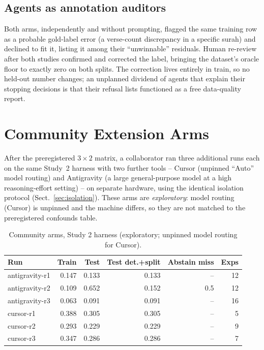\documentclass[runningheads]{llncs}
\begin{document}
\subsection{Agents as annotation auditors}
\label{sec:study2-audit}
Both arms, independently and without prompting, flagged the same training
row as a probable gold-label error (a verse-count discrepancy in a specific
surah) and declined to fit it, listing it among their ``unwinnable''
residuals. Human re-review after both studies confirmed and corrected the
label, bringing the dataset's oracle floor to exactly zero on both splits.
The correction lives entirely in train, so no held-out number changes; an
unplanned dividend of agents that explain their stopping decisions is that
their refusal lists functioned as a free data-quality report.

\section{Community Extension Arms}
\label{sec:community}

After the preregistered $3\times2$ matrix, a collaborator ran three
additional runs each on the same Study~2 harness with two further tools --
Cursor (unpinned ``Auto'' model routing) and Antigravity (a large
general-purpose model at a high reasoning-effort setting) -- on separate
hardware, using the identical isolation protocol
(Sect.~\ref{sec:isolation}). These arms are \emph{exploratory}: model
routing (Cursor) is unpinned and the machine differs, so they are not
matched to the preregistered confounds table.

\begin{table}[t]
\centering
\caption{Community arms, Study 2 harness (exploratory; unpinned model
routing for Cursor).}
\label{tab:community}
\begin{tabular}{lrrrrr}
\toprule
Run & Train & Test & Test det.+split & Abstain miss & Exps \\
\midrule
antigravity-r1 & 0.147 & 0.133 & 0.133 & --  & 12 \\
antigravity-r2 & 0.109 & 0.652 & 0.152 & 0.5 & 12 \\
antigravity-r3 & 0.063 & 0.091 & 0.091 & --  & 16 \\
cursor-r1      & 0.388 & 0.305 & 0.305 & --  & 5  \\
cursor-r2      & 0.293 & 0.229 & 0.229 & --  & 9  \\
cursor-r3      & 0.347 & 0.286 & 0.286 & --  & 7  \\
\bottomrule
\end{tabular}
\end{table}
\end{document}
